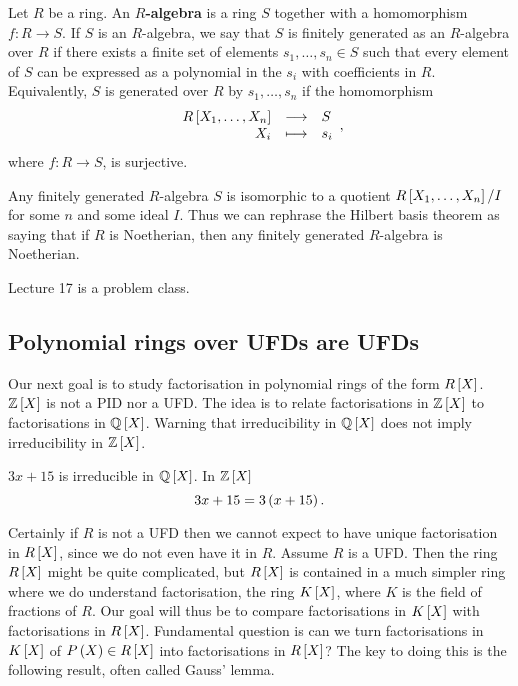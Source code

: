 \begin{definition}
Let $ R $ be a ring. An \textbf{$ R $-algebra} is a ring $ S $ together with a homomorphism $ f : R \to S $. If $ S $ is an $ R $-algebra, we say that $ S $ is finitely generated as an $ R $-algebra over $ R $ if there exists a finite set of elements $ s_1, \dots, s_n \in S $ such that every element of $ S $ can be expressed as a polynomial in the $ s_i $ with coefficients in $ R $. Equivalently, $ S $ is generated over $ R $ by $ s_1, \dots, s_n $ if the homomorphism
$$ \function{R\sbr{X_1, \dots, X_n}}{S}{X_i}{s_i}, $$
where $ f : R \to S $, is surjective.
\end{definition}

\begin{note*}
Any finitely generated $ R $-algebra $ S $ is isomorphic to a quotient $ R\sbr{X_1, \dots, X_n} / I $ for some $ n $ and some ideal $ I $. Thus we can rephrase the Hilbert basis theorem as saying that if $ R $ is Noetherian, then any finitely generated $ R $-algebra is Noetherian.
\end{note*}


Lecture 17 is a problem class.


\subsection{Polynomial rings over UFDs are UFDs}

Our next goal is to study factorisation in polynomial rings of the form $ R\sbr{X} $. $ \Z\sbr{X} $ is not a PID nor a UFD. The idea is to relate factorisations in $ \Z\sbr{X} $ to factorisations in $ \Q\sbr{X} $. Warning that irreducibility in $ \Q\sbr{X} $ does not imply irreducibility in $ \Z\sbr{X} $.

\begin{example*}
$ 3x + 15 $ is irreducible in $ \Q\sbr{X} $. In $ \Z\sbr{X} $
$$ 3x + 15 = 3\br{x + 15}. $$
\end{example*}

Certainly if $ R $ is not a UFD then we cannot expect to have unique factorisation in $ R\sbr{X} $, since we do not even have it in $ R $. Assume $ R $ is a UFD. Then the ring $ R\sbr{X} $ might be quite complicated, but $ R\sbr{X} $ is contained in a much simpler ring where we do understand factorisation, the ring $ K\sbr{X} $, where $ K $ is the field of fractions of $ R $. Our goal will thus be to compare factorisations in $ K\sbr{X} $ with factorisations in $ R\sbr{X} $. Fundamental question is can we turn factorisations in $ K\sbr{X} $ of $ P\br{X} \in R\sbr{X} $ into factorisations in $ R\sbr{X} $? The key to doing this is the following result, often called Gauss' lemma.

